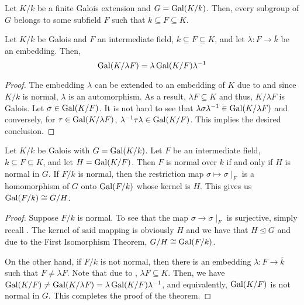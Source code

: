 \begin{corollary}
    Let $K/k$ be a finite Galois extension and $G = \operatorname{Gal}(K/k)$. Then, every subgroup of $G$ belongs to some subfield $F$ such that $k\subseteq F\subseteq K$.
\end{corollary}

\begin{lemma}
    Let $K/k$ be Galois and $F$ an intermediate field, $k\subseteq F\subseteq K$, and let $\lambda: F\to\overline{k}$ be an embedding. Then, 
    \begin{equation*}
        \operatorname{Gal}(K/\lambda F) = \lambda\operatorname{Gal}(K/F)\lambda^{-1}
    \end{equation*}
\end{lemma}
\begin{proof}
    The embedding $\lambda$ can be extended to an embedding of $K$ due to  and since $K/k$ is normal, $\lambda$ is an automorphism. As a result, $\lambda F\subseteq K$ and thus, $K/\lambda F$ is Galois. Let $\sigma\in\operatorname{Gal}(K/F)$. It is not hard to see that $\lambda\sigma\lambda^{-1}\in\operatorname{Gal}(K/\lambda F)$ and conversely, for $\tau\in\operatorname{Gal}(K/\lambda F)$, $\lambda^{-1}\tau\lambda\in\operatorname{Gal}(K/F)$. This implies the desired conclusion.
\end{proof}

\begin{theorem}
    Let $K/k$ be Galois with $G = \operatorname{Gal}(K/k)$. Let $F$ be an intermediate field, $k\subseteq F\subseteq K$, and let $H = \operatorname{Gal}(K/F)$. Then $F$ is normal over $k$ if and only if $H$ is normal in $G$. If $F/k$ is normal, then the restriction map $\sigma\mapsto\sigma\mid_F$ is a homomorphism of $G$ onto $\operatorname{Gal}(F/k)$ whose kernel is $H$. This gives us $\operatorname{Gal}(F/k)\cong G/H$.
\end{theorem}
\begin{proof}
    Suppose $F/k$ is normal. To see that the map $\sigma\to\sigma\mid_F$ is surjective, simply recall . The kernel of said mapping is obviously $H$ and we have that $H\unlhd G$ and due to the First Isomorphism Theorem, $G/H\cong\operatorname{Gal}(F/k)$.

    On the other hand, if $F/k$ is not normal, then there is an embedding $\lambda: F\to\overline{k}$ such that $F\ne\lambda F$. Note that due to , $\lambda F\subseteq K$. Then, we have $\operatorname{Gal}(K/F)\ne\operatorname{Gal}(K/\lambda F) = \lambda\operatorname{Gal}(K/F)\lambda^{-1}$, and equivalently, $\operatorname{Gal}(K/F)$ is not normal in $G$. This completes the proof of the theorem.
\end{proof}

